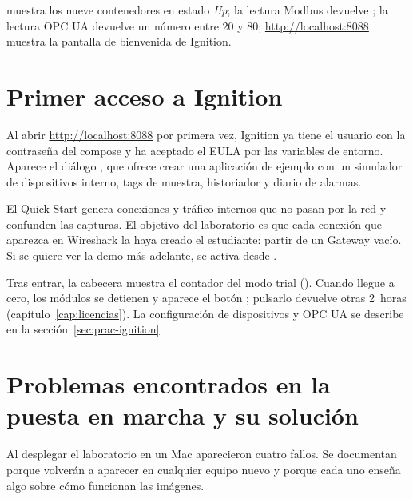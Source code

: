 \begin{ok}
 muestra los nueve contenedores en estado \emph{Up}; la lectura Modbus devuelve \cmd{[1234, 25, 72]}; la lectura OPC UA devuelve un número entre 20 y 80; \url{http://localhost:8088} muestra la pantalla de bienvenida de Ignition.
\end{ok}

\section{Primer acceso a Ignition}
\label{sec:ignition-primer}

Al abrir \url{http://localhost:8088} por primera vez, Ignition ya tiene el usuario  con la contraseña del compose y ha aceptado el EULA por las variables de entorno. Aparece el diálogo , que ofrece crear una aplicación de ejemplo con un simulador de dispositivos interno, tags de muestra, historiador y diario de alarmas.

\begin{aviso}
El Quick Start genera conexiones y tráfico internos que no pasan por la red \lab{} y confunden las capturas. El objetivo del laboratorio es que cada conexión que aparezca en Wireshark la haya creado el estudiante: partir de un Gateway vacío. Si se quiere ver la demo más adelante, se activa desde .
\end{aviso}

Tras entrar, la cabecera muestra el contador del modo trial (). Cuando llegue a cero, los módulos se detienen y aparece el botón ; pulsarlo devuelve otras 2~horas (capítulo~\ref{cap:licencias}). La configuración de dispositivos y OPC UA se describe en la sección~\ref{sec:prac-ignition}.

\section{Problemas encontrados en la puesta en marcha y su solución}
\label{sec:fallos}

Al desplegar el laboratorio en un Mac aparecieron cuatro fallos. Se documentan porque volverán a aparecer en cualquier equipo nuevo y porque cada uno enseña algo sobre cómo funcionan las imágenes.

